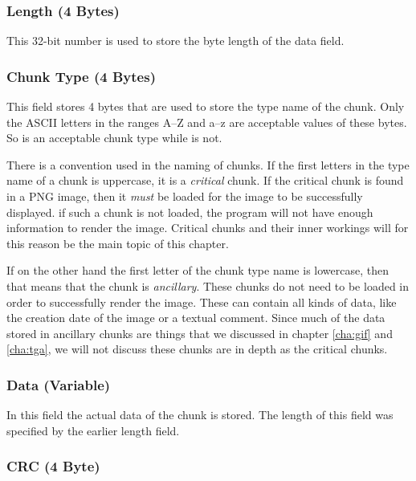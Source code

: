 \subsubsection*{Length (4 Bytes)}

This 32-bit number is used to store the byte length of the data
field.




\subsubsection*{Chunk Type (4 Bytes)}

This field stores 4 bytes that are used to store the type name of the
chunk. Only the ASCII letters in the ranges A--Z and a--z are
acceptable values of these bytes. So  is an acceptable
chunk type while  is not.

There is a convention used in the naming of chunks. If the first
letters in the type name of a chunk is uppercase, it is a
\textit{critical} chunk. If the critical chunk is found in a PNG
image, then it \textit{must} be loaded for the image to be
successfully displayed.  if such a chunk is not loaded, the program
will not have enough information to render the image. Critical chunks
and their inner workings will for this reason be the main topic of
this chapter.

If on the other hand the first letter of the chunk type name is
lowercase, then that means that the chunk is \textit{ancillary}. These
chunks do not need to be loaded in order to successfully render the
image. These can contain all kinds of data, like the creation date of
the image or a textual comment. Since much of the data stored in
ancillary chunks are things that we discussed in chapter \ref{cha:gif}
and \ref{cha:tga}, we will not discuss these chunks are in depth as
the critical chunks.


\subsubsection*{Data (Variable)}

In this field the actual data of the chunk is stored. The length of
this field was specified by the earlier length field.

\subsubsection*{CRC (4 Byte)}

